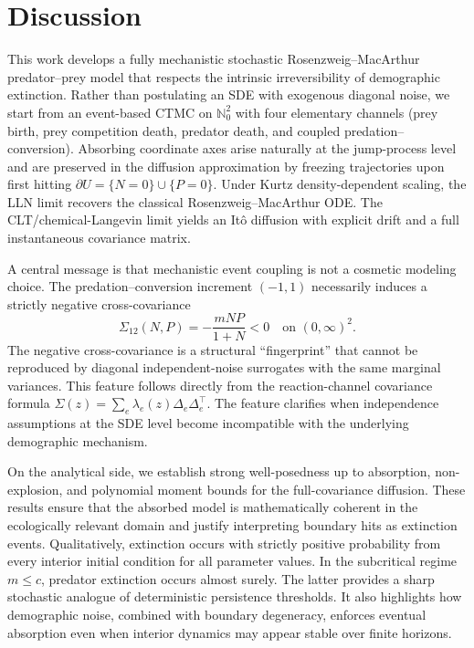 \documentclass[pdflatex,sn-mathphys-ay]{sn-jnl}
\theoremstyle{thmstyleone}
\theoremstyle{definition}
\theoremstyle{remark}
\begin{document}
\section{Discussion}

This work develops a fully mechanistic stochastic Rosenzweig–MacArthur predator–prey model that respects the intrinsic irreversibility of demographic extinction. Rather than postulating an SDE with exogenous diagonal noise, we start from an event-based CTMC on $\mathbb{N}_0^2$ with four elementary channels (prey birth, prey competition death, predator death, and coupled predation–conversion). Absorbing coordinate axes arise naturally at the jump-process level and are preserved in the diffusion approximation by freezing trajectories upon first hitting $\partial U=\{N=0\}\cup\{P=0\}$. 
Under Kurtz density-dependent scaling, the LLN limit recovers the classical Rosenzweig–MacArthur ODE. The CLT/chemical-Langevin limit yields an It\^o diffusion with explicit drift and a full instantaneous covariance matrix.

A central message is that mechanistic event coupling is not a cosmetic modeling choice. The predation–conversion increment $(-1,1)$ necessarily induces a strictly negative cross-covariance
\[
\Sigma_{12}(N,P)=-\frac{mNP}{1+N}<0\quad \text{on }(0,\infty)^2.
\]
The negative cross-covariance is a structural “fingerprint” that cannot be reproduced by diagonal independent-noise surrogates with the same marginal variances. This feature follows directly from the reaction-channel covariance formula $\Sigma(z)=\sum_e \lambda_e(z)\Delta_e\Delta_e^\top$. The feature clarifies when independence assumptions at the SDE level become incompatible with the underlying demographic mechanism.

On the analytical side, we establish strong well-posedness up to absorption, non-explosion, and polynomial moment bounds for the full-covariance diffusion. These results ensure that the absorbed model is mathematically coherent in the ecologically relevant domain and justify interpreting boundary hits as extinction events. Qualitatively, extinction occurs with strictly positive probability from every interior initial condition for all parameter values. In the subcritical regime $m\le c$, predator extinction occurs almost surely. The latter provides a sharp stochastic analogue of deterministic persistence thresholds. It also highlights how demographic noise, combined with boundary degeneracy, enforces eventual absorption even when interior dynamics may appear stable over finite horizons.
\end{document}
